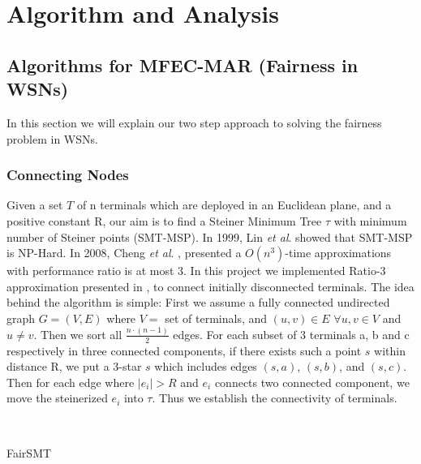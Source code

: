 \section{Algorithm and Analysis}\label{AlgorithmAndAnalysis}

\subsection{Algorithms for MFEC-MAR (Fairness in WSNs)}
In this section we will explain our two step approach to solving the fairness problem in WSNs.

\subsubsection{Connecting Nodes}\label{connectingNodes}
Given a set $T$ of n terminals which are deployed in an Euclidean plane, and a positive constant R, our aim is to find a Steiner Minimum Tree $\tau$ with minimum number of Steiner points (SMT-MSP). In 1999, Lin \textit{et al}. \cite{308672} showed that SMT-MSP is NP-Hard. In 2008, Cheng \textit{et al}. \cite{RelaySensor}, presented a $O(n^{3})$-time approximations with performance ratio is at most 3. In this project we implemented Ratio-3 approximation presented in \cite{RelaySensor}, to connect initially disconnected terminals. The idea behind the algorithm is simple: First we assume a fully connected undirected graph $G=(V,E)$ where $V=$ set of terminals, and $(u,v)\in E$ $\forall u,v \in V$ and $u\neq v$. Then we sort all $\frac{n\cdot(n-1)}{2}$ edges. For each subset of 3 terminals a, b and c respectively in three connected components, if there exists such a point $s$ within distance R, we put a 3-star $s$ which includes edges $(s,a)$, $(s,b)$, and $(s,c)$. Then for each edge where $\left|e_i\right| > R$ and $e_i$ connects two connected component, we move the steinerized $e_i$ into $\tau$. Thus we establish the connectivity of terminals.

\linesnumbered
\begin{algorithm}[htp]

\dontprintsemicolon
{}
\\
\caption{FairSMT}
\label{FairSMT}
\end{algorithm}


